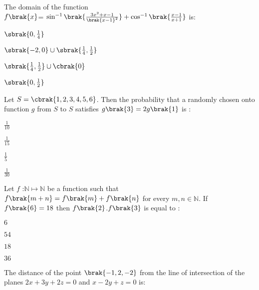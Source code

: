 \item %
The domain of the function \\
$f\brak{x}$= $\sin ^{-1} \brak{\frac{3x^2+x-1}{\brak{x-1}^2}}+\cos ^{-1} \brak{\frac{x-1}{x+1}}$ is:
\begin{enumerate}
\begin{multicols}{2}
\item 
$\sbrak{0,\frac{1}{4}}$
\item 
$\sbrak{-2,0} \cup \sbrak{\frac{1}{4},\frac{1}{2}}$
\end{multicols}
\begin{multicols}{2}
\item 
$\sbrak{\frac{1}{4},\frac{1}{2}} \cup \cbrak{0} $
\item 
$\sbrak{0,\frac{1}{2}}$
\end{multicols}
\end{enumerate}
\item %
Let $S= \cbrak{1,2,3,4,5,6}$. Then the probability that a randomly chosen onto function $g$ from $S$ to $S$ satisfies $g\brak{3}=2g\brak{1}$ is :
\begin{enumerate}
\begin{multicols}{2}
\item $\frac{1}{10}$
\item $\frac{1}{15}$
\end{multicols}
\begin{multicols}{2}
\item $\frac{1}{5}$
\item $\frac{1}{30}$
\end{multicols}
\end{enumerate}
\item %
Let $f$ :$ \mathbb{N} \mapsto \mathbb{N}$ be a  function such that $f\brak{m+n}=f\brak{m}+f\brak{n}$ for every $m,n \in \mathbb{N}$. If $f\brak{6}=18$ then $f\brak{2}$.$f\brak{3}$ is equal to :
\begin{enumerate}
\begin{multicols}{2}
\item $6$
\item $54$
\end{multicols}
\begin{multicols}{2}
\item $18$
\item $36$
\end{multicols}
\end{enumerate}
\item %
The distance of the point $\brak{-1,2,-2}$ from the line of intersection of the planes $2x+3y+2z=0$ and $x-2y+z=0$ is:
